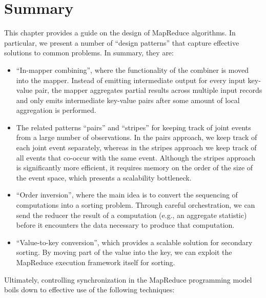 \documentclass[11pt]{article}
\begin{document}
\section{Summary}

This chapter provides a guide on the design of MapReduce algorithms.
In particular, we present a number of ``design patterns'' that capture
effective solutions to common problems.  In summary, they are:

\begin{itemize}

\item ``In-mapper combining'', where the functionality of the combiner
  is moved into the mapper.  Instead of emitting intermediate output
  for every input key-value pair, the mapper aggregates partial
  results across multiple input records and only emits intermediate
  key-value pairs after some amount of local aggregation is performed.

\item The related patterns ``pairs'' and ``stripes'' for keeping track
  of joint events from a large number of observations.  In the pairs
  approach, we keep track of each joint event separately, whereas in
  the stripes approach we keep track of all events that co-occur with
  the same event.  Although the stripes approach is significantly more
  efficient, it requires memory on the order of the size of the event
  space, which presents a scalability bottleneck.

\item ``Order inversion'', where the main idea is to convert the
  sequencing of computations into a sorting problem.  Through careful
  orchestration, we can send the reducer the result of a computation
  (e.g., an aggregate statistic) before it encounters the data
  necessary to produce that computation.

\item ``Value-to-key conversion'', which provides a scalable solution
  for secondary sorting.  By moving part of the value into the key, we
  can exploit the MapReduce execution framework itself for sorting.

\end{itemize}

\noindent Ultimately, controlling synchronization in the MapReduce
programming model boils down to effective use of the following
techniques:
\end{document}
